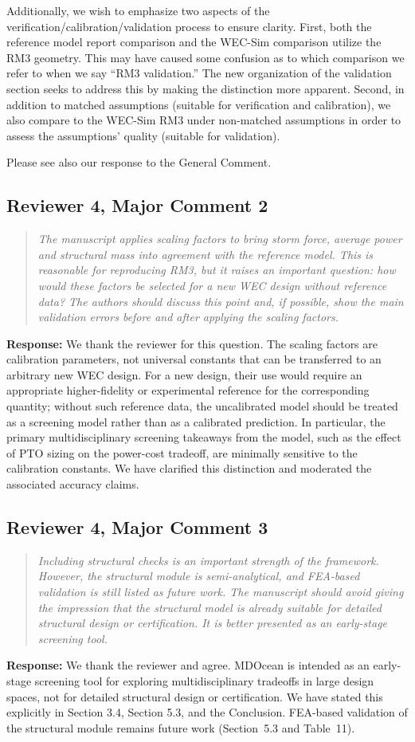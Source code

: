 \documentclass[11pt]{article}
\newcommand{\rcomment}[2]{\subsection*{#1}\begin{quote}\itshape #2\end{quote}}
\newcommand{\response}{\noindent\textbf{Response:} }
\begin{document}
Additionally, we wish to emphasize two aspects of the verification/calibration/validation process to ensure clarity.
First, both the reference model report comparison and the WEC-Sim comparison utilize the RM3 geometry.
This may have caused some confusion as to which comparison we refer to when we say ``RM3 validation.''
The new organization of the validation section seeks to address this by making the distinction more apparent.
Second, in addition to matched assumptions (suitable for verification and calibration), we also compare to the WEC-Sim RM3 under non-matched assumptions in order to assess the assumptions' quality (suitable for validation).

Please see also our response to the General Comment.

\rcomment{Reviewer 4, Major Comment 2}{The manuscript applies scaling factors to bring storm force, average power and structural mass into agreement with the reference model. This is reasonable for reproducing RM3, but it raises an important question: how would these factors be selected for a new WEC design without reference data? The authors should discuss this point and, if possible, show the main validation errors before and after applying the scaling factors.}
\response We thank the reviewer for this question. %
The scaling factors are calibration parameters, not universal constants that can be transferred to an arbitrary new WEC design.
For a new design, their use would require an appropriate higher-fidelity or experimental reference for the corresponding quantity; without such reference data, the uncalibrated model should be treated as a screening model rather than as a calibrated prediction.
In particular, the primary multidisciplinary screening takeaways from the model, such as the effect of PTO sizing on the power-cost tradeoff, are minimally sensitive to the calibration constants.
We have clarified this distinction and moderated the associated accuracy claims.

\rcomment{Reviewer 4, Major Comment 3}{Including structural checks is an important strength of the framework. However, the structural module is semi-analytical, and FEA-based validation is still listed as future work. The manuscript should avoid giving the impression that the structural model is already suitable for detailed structural design or certification. It is better presented as an early-stage screening tool.}
\response We thank the reviewer and agree.
MDOcean is intended as an early-stage screening tool for exploring multidisciplinary tradeoffs in large design spaces,
not for detailed structural design or certification.
We have stated this explicitly in Section 3.4, Section 5.3, and the Conclusion.
FEA-based validation of the structural module remains future work (Section~5.3 and Table~11).
\end{document}
